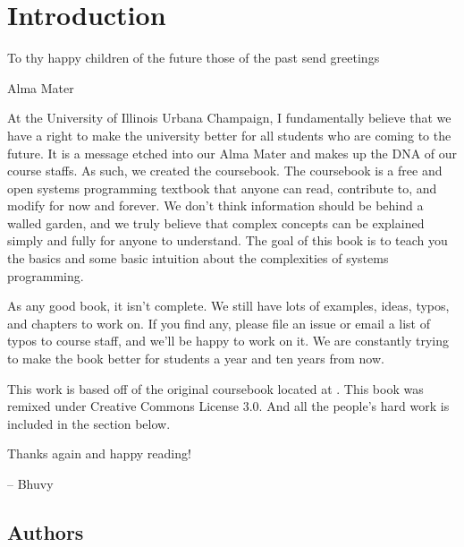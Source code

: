 \chapter{Introduction}

\epigraph{To thy happy children of the future those of the past send greetings}{Alma Mater}

At the University of Illinois Urbana Champaign, I fundamentally believe that we have a right to make the university better for all students who are coming to the future.
It is a message etched into our Alma Mater and makes up the DNA of our course staffs.
As such, we created the coursebook.
The coursebook is a free and open systems programming textbook that anyone can read, contribute to, and modify for now and forever.
We don't think information should be behind a walled garden, and we truly believe that complex concepts can be explained simply and fully for anyone to understand.
The goal of this book is to teach you the basics and some basic intuition about the complexities of systems programming.

As any good book, it isn't complete.
We still have lots of examples, ideas, typos, and chapters to work on.
If you find any, please file an issue or email a list of typos to course staff, and we'll be happy to work on it.
We are constantly trying to make the book better for students a year and ten years from now.

This work is based off of the original coursebook located at .
This book was remixed under Creative Commons License 3.0.
And all the people's hard work is included in the section below.

Thanks again and happy reading!

-- Bhuvy

\section{Authors}



